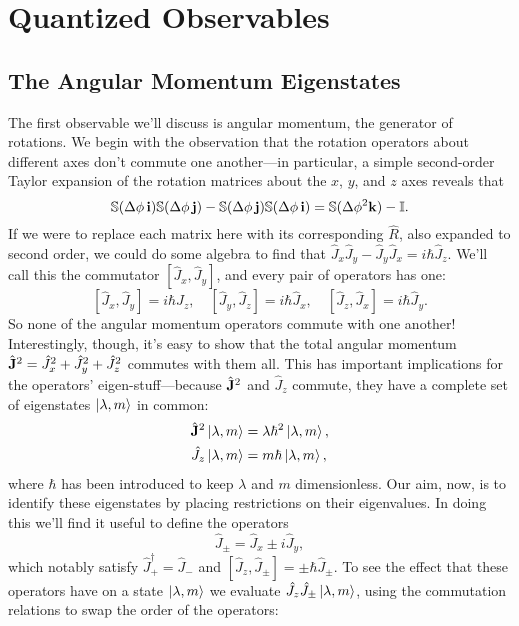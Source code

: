 \documentclass[../p116main.tex]{subfiles}
\begin{document}
\chapter{Quantized Observables}
\section{The Angular Momentum Eigenstates}
The first observable we'll discuss is angular momentum, the generator of rotations.
We begin with the observation that the rotation operators about different axes don't commute one another---in particular, a simple second-order Taylor expansion of the rotation matrices about the $x$, $y$, and $z$ axes reveals that
\[ \mathbb S (\Delta \phi \, \mathbf{i}) \mathbb S (\Delta \phi \, \mathbf{j}) - \mathbb S (\Delta \phi \, \mathbf{j}) \mathbb S (\Delta \phi \, \mathbf{i}) = \mathbb S (\Delta \phi^2 \mathbf{k}) - \mathbb I. \]
If we were to replace each matrix here with its corresponding $\hat R$, also expanded to second order, we could do some algebra to find that $\hat J_x \hat J_y - \hat J_y \hat J_x = i\hbar \hat J_z$.
We'll call this the commutator $[\hat J_x, \hat J_y]$, and every pair of operators has one:
\[ [\hat J_x, \hat J_y] = i\hbar \hat J_z, \quad [\hat J_y, \hat J_z] = i\hbar \hat J_x, \quad [\hat J_z, \hat J_x] = i\hbar \hat J_y. \]
So none of the angular momentum operators commute with one another!
Interestingly, though, it's easy to show that the total angular momentum $\hat{\mathbf{J}}^2 = \hat J_x^2 + \hat J_y^2 + \hat J_z^2$ commutes with them all.
This has important implications for the operators' eigen-stuff---because $\hat{\mathbf{J}}^2$ and $\hat J_z$ commute, they have a complete set of eigenstates $\left| \lambda, m \right>$ in common: \vspace{-10pt}
\begin{align*}
    \hat{\mathbf{J}}^2 \left| \lambda, m \right> &= \lambda \hbar^2 \left| \lambda, m \right>, \\
    \hat J_z \left| \lambda, m \right> &= m \hbar \left| \lambda, m \right>,
\end{align*}
where $\hbar$ has been introduced to keep $\lambda$ and $m$ dimensionless.
Our aim, now, is to identify these eigenstates by placing restrictions on their eigenvalues.
In doing this we'll find it useful to define the operators
\[ \hat J_\pm = \hat J_x \pm i \hat J_y, \]
which notably satisfy $\hat J_+^\dagger = \hat J_-$ and $[\hat J_z, \hat J_\pm] = \pm \hbar \hat J_\pm$.
To see the effect that these operators have on a state $\left| \lambda, m \right>$ we evaluate $\hat J_z \hat J_\pm \left| \lambda, m \right>$, using the commutation relations to swap the order of the operators:
\end{document}
